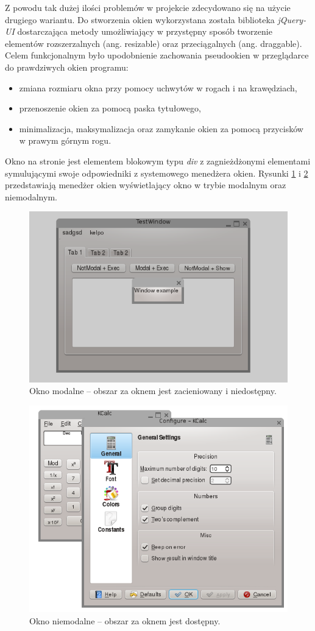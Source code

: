 Z powodu tak dużej ilości problemów w projekcie zdecydowano się na użycie drugiego wariantu. Do stworzenia okien wykorzystana została biblioteka \emph{jQuery-UI} dostarczająca metody umożliwiający w przystępny sposób tworzenie elementów rozszerzalnych (ang. resizable) oraz przeciągalnych (ang. draggable). Celem funkcjonalnym było upodobnienie zachowania pseudookien w przeglądarce do prawdziwych okien programu:
\begin{itemize}
  \item zmiana rozmiaru okna przy pomocy uchwytów w rogach i na krawędziach,
  \item przenoszenie okien za pomocą paska tytułowego,
  \item minimalizacja, maksymalizacja oraz zamykanie okien za pomocą przycisków w prawym górnym rogu.
\end{itemize}

Okno na stronie jest elementem blokowym typu \emph{div} z zagnieżdżonymi elementami symulującymi swoje odpowiedniki z systemowego menedżera okien.
Rysunki \ref{fig:modal} i \ref{fig:non_modal} przedstawiają menedżer okien wyświetlający okno w trybie modalnym oraz niemodalnym.

\begin{figure}
\centering
\includegraphics[width=0.7\linewidth]{img/modal}
\caption{Okno modalne -- obszar za oknem jest zacieniowany i niedostępny.}
\label{fig:modal}
\end{figure}

\begin{figure}
\centering
\includegraphics[width=0.7\linewidth]{img/non_modal}
\caption{Okno niemodalne -- obszar za oknem jest dostępny.}
\label{fig:non_modal}
\end{figure}


